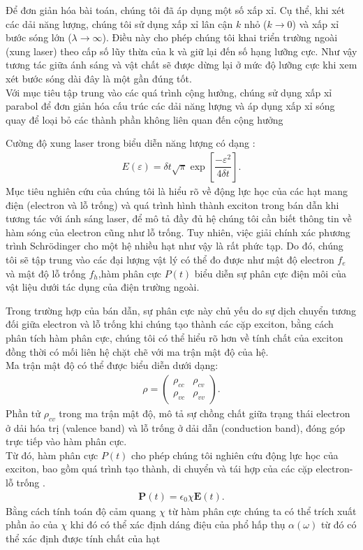 \documentclass[%
reprint,
amsmath,amssymb,
superscriptaddress,
aps,
]{revtex4-2}
\newcommand{\f}[2]{\dfrac{#1}{#2}}
\begin{document}
Để đơn giản hóa bài toán, chúng tôi đã áp dụng một số xấp xỉ. Cụ thể, khi xét các dải năng lượng, chúng tôi sử dụng xấp xỉ lân cận $k$ nhỏ ($k\rightarrow 0$) và xấp xỉ bước sóng lớn ($\lambda\rightarrow\infty$). Điều này cho phép chúng tôi khai triển trường ngoài (xung laser) theo cấp số lũy thừa của k và giữ lại đến số hạng lưỡng cực. Như vậy tương tác giữa ánh sáng và vật chất sẽ được dừng lại ở mức độ lưỡng cực khi xem xét bước sóng dài đây là một gần đúng tốt.\\
Với mục tiêu tập trung vào các quá trình cộng hưởng, chúng sử dụng xấp xỉ parabol để đơn giản hóa cấu trúc các dải năng lượng và áp dụng xấp xỉ sóng quay để loại bỏ các thành phần không liên quan đến cộng hưởng 

Cường độ xung laser trong biểu diễn năng lượng có dạng :
\begin{align}
	E(\varepsilon)=\delta t\sqrt{\pi}\exp[\f{-\varepsilon^2}{4\delta t}]. \label{Eq:1}
\end{align}
Mục tiêu nghiên cứu của chúng tôi là hiểu rõ về động lực học của các hạt mang điện (electron và lỗ trống) và quá trình hình thành exciton trong bán dẫn khi tương tác với ánh sáng laser, để mô tả đầy đủ hệ chúng tôi cần biết thông tin về hàm sóng của electron cũng như lỗ trống. Tuy nhiên, việc giải chính xác phương trình Schrödinger cho một hệ nhiều hạt như vậy là rất phức tạp. Do đó, chúng tôi sẽ tập trung vào các đại lượng vật lý có thể đo được như mật độ electron $f_e$ và mật độ lỗ trống $f_h$,hàm phân cực $P(t)$  biểu diễn sự phân cực điện môi của vật liệu dưới tác dụng của điện trường ngoài.

Trong trường hợp của bán dẫn, sự phân cực này chủ yếu do sự dịch chuyển tương đối giữa electron và lỗ trống khi chúng tạo thành các cặp exciton, bằng cách phân tích hàm phân cực, chúng tôi có thể hiểu rõ hơn về tính chất của exciton đồng thời có mối liên hệ chặt chẽ với ma trận mật độ của hệ.\\
Ma trận mật độ có thể được biểu diễn dưới dạng:
\begin{align*}
	\rho = \begin{pmatrix}
		\rho_{cc} & \rho_{cv} \\
		\rho_{vc} & \rho_{vv}
	\end{pmatrix} .
\end{align*}
Phần tử $\rho_{cv}$ trong ma trận mật độ, mô tả sự chồng chất giữa trạng thái electron ở dải hóa trị (valence band) và lỗ trống ở dải dẫn (conduction band), đóng góp trực tiếp vào hàm phân cực.\\
Từ đó, hàm phân cực $P(t)$ cho phép chúng tôi nghiên cứu động lực học của exciton, bao gồm quá trình tạo thành, di chuyển và tái hợp của các cặp electron-lỗ trống \cite{doi:10.1142/7184}. 
\begin{align}
	\mathbf{P}(t) = \epsilon_0 \chi \mathbf{E}(t). \label{Eq:2}
\end{align}
Bằng cách tính toán độ cảm quang $\chi$ từ hàm phân cực chúng ta có thể trích xuất phần ảo của $\chi$ khi đó có thể xác định dáng điệu của phổ hấp thụ $\alpha{(\omega)}$ từ đó có thể xác định được tính chất của hạt
\end{document}
